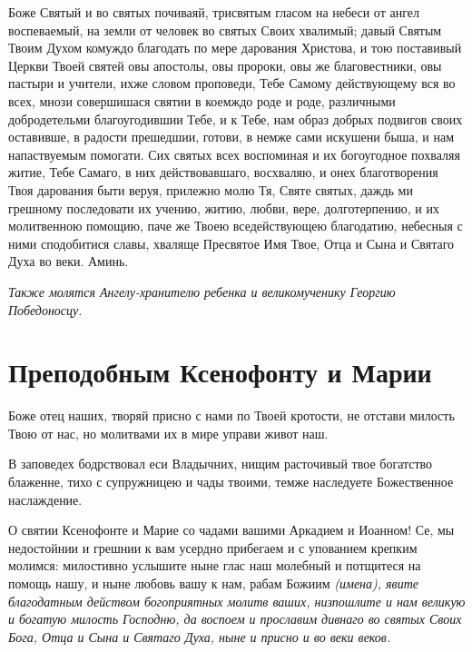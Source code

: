 Боже Святый и во святых почиваяй, трисвятым гласом на небеси от ангел воспеваемый, на земли от человек во святых Своих хвалимый; давый Святым Твоим Духом комуждо благодать по мере дарования Христова, и тою поставивый Церкви Твоей святей овы апостолы, овы пророки, овы же благовестники, овы пастыри и учители, ихже словом проповеди, Тебе Самому действующему вся во всех, мнози совершишася святии в коемждо роде и роде, различными добродетельми благоугодившии Тебе, и к Тебе, нам образ добрых подвигов своих оставивше, в радости прешедшии, готови, в немже сами искушени быша, и нам напаствуемым помогати. Сих святых всех воспоминая и их богоугодное похваляя житие, Тебе Самаго, в них действовавшаго, восхваляю, и онех благотворения Твоя дарования быти веруя, прилежно молю Тя, Святе святых, даждь ми грешному последовати их учению, житию, любви, вере, долготерпению, и их молитвенною помощию, паче же Твоею вседействующею благодатию, небесныя с ними сподобитися славы, хваляще Пресвятое Имя Твое, Отца и Сына и Святаго Духа во веки. Аминь.

\itshape Также молятся Ангелу-хранителю ребенка и великомученику Георгию Победоносцу.

\normalfont{} 


\section{Преподобным Ксенофонту и Марии}
 


Боже отец наших, творяй присно с нами по Твоей кротости, не отстави милость Твою от нас, но молитвами их в мире управи живот наш.




В заповедех бодрствовал еси Владычних, нищим расточивый твое богатство блаженне, тихо с супружницею и чады твоими, темже наследуете Божественное наслаждение.




О святии Ксенофонте и Марие со чадами вашими Аркадием и Иоанном! Се, мы недостойнии и грешнии к вам усердно прибегаем и с упованием крепким молимся: милостивно услышите ныне глас наш молебный и потщитеся на помощь нашу, и ныне любовь вашу к нам, рабам Божиим \itshape (имена)\normalfont{}, явите благодатным действом богоприятных молитв ваших, низпошлите и нам великую и богатую милость Господню, да воспоем и прославим дивнаго во святых Своих Бога, Отца и Сына и Святаго Духа, ныне и присно и во веки веков.

